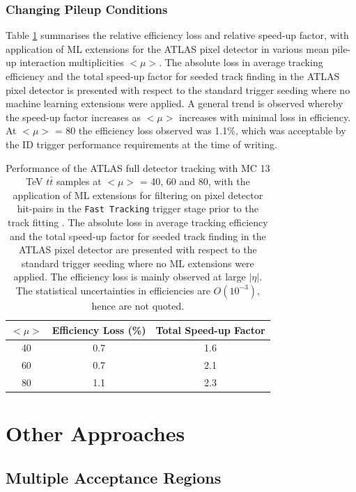\subsubsection{Changing Pileup Conditions}

Table \ref{tab:pileup} summarises the relative efficiency loss and relative speed-up factor, with application of ML extensions for the ATLAS pixel detector in various mean pile-up interaction multiplicities $<\mu>$. The absolute loss in average tracking efficiency and the total speed-up factor for seeded track finding in the ATLAS pixel detector is presented with respect to the standard trigger seeding where no machine learning extensions were applied. A general trend is observed whereby the speed-up factor increases as $<\mu>$ increases with minimal loss in efficiency. At $<\mu>$ = 80 the efficiency loss observed was 1.1\%, which was acceptable by the ID trigger performance requirements at the time of writing.


\begin{table}[!htbp]
\caption{Performance of the ATLAS full detector tracking with MC 13 TeV $t\bar{t}$ samples at $<\mu>$ = 40, 60 and 80, with the application of ML extensions for filtering on pixel detector hit-pairs in the \texttt{Fast Tracking} trigger stage prior to the track fitting \cite{public-hlt}. The absolute loss in average tracking efficiency and the total speed-up factor for seeded track finding in the ATLAS pixel detector are presented with respect to the standard trigger seeding where no ML extensions were applied. The efficiency loss is mainly observed at large $|\eta|$. The statistical uncertainties in efficiencies are $O(10^{-3})$, hence are not quoted.}
\begin{center}
\begin{tabular}{ccc}
\toprule
$<\mu>$ & Efficiency Loss (\%) & Total Speed-up Factor  \\
\hline
40 & 0.7 & 1.6 \\
60 & 0.7 & 2.1 \\
80 & 1.1 & 2.3 \\
\bottomrule
\end{tabular}
\end{center}
\label{tab:pileup}
\end{table}


\section{Other Approaches}
\subsection{Multiple Acceptance Regions}

